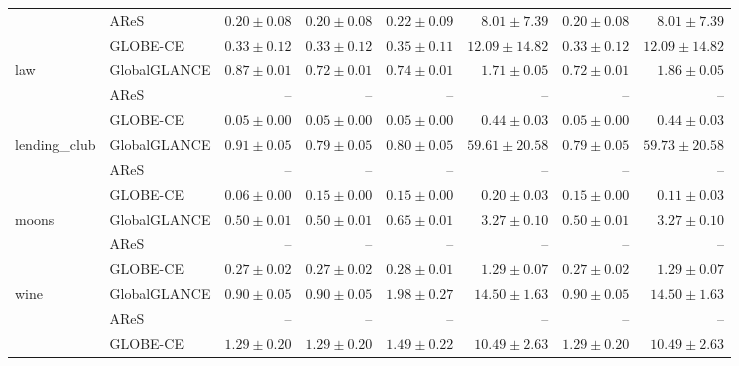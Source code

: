 \begin{table}[ht]
\begin{center}
\begin{sc}
\begin{scriptsize}
\begin{tabular}{l|l|rrrrrr}
 & AReS & $\boldsymbol{0.20\pm{0.08}}$ & $\boldsymbol{0.20\pm{0.08}}$ & $\boldsymbol{0.22\pm{0.09}}$ & $\boldsymbol{8.01\pm{7.39}}$ & $\boldsymbol{0.20\pm{0.08}}$ & $\boldsymbol{8.01\pm{7.39}}$ \\
 & GLOBE-CE & $0.33\pm{0.12}$ & $0.33\pm{0.12}$ & $0.35\pm{0.11}$ & $12.09\pm{14.82}$ & $0.33\pm{0.12}$ & $12.09\pm{14.82}$ \\
\midrule
\multirow{3}{*}{law} & GlobalGLANCE & $0.87\pm{0.01}$ & $0.72\pm{0.01}$ & $0.74\pm{0.01}$ & $1.71\pm{0.05}$ & $0.72\pm{0.01}$ & $1.86\pm{0.05}$ \\
 & AReS & -- & -- & -- & -- & -- & -- \\
 & GLOBE-CE & $\boldsymbol{0.05\pm{0.00}}$ & $\boldsymbol{0.05\pm{0.00}}$ & $\boldsymbol{0.05\pm{0.00}}$ & $\boldsymbol{0.44\pm{0.03}}$ & $\boldsymbol{0.05\pm{0.00}}$ & $\boldsymbol{0.44\pm{0.03}}$ \\
\midrule
\multirow{3}{*}{lending\_club} & GlobalGLANCE & $0.91\pm{0.05}$ & $0.79\pm{0.05}$ & $0.80\pm{0.05}$ & $59.61\pm{20.58}$ & $0.79\pm{0.05}$ & $59.73\pm{20.58}$ \\
 & AReS & -- & -- & -- & -- & -- & -- \\
 & GLOBE-CE & $\boldsymbol{0.06\pm{0.00}}$ & $\boldsymbol{0.15\pm{0.00}}$ & $\boldsymbol{0.15\pm{0.00}}$ & $\boldsymbol{0.20\pm{0.03}}$ & $\boldsymbol{0.15\pm{0.00}}$ & $\boldsymbol{0.11\pm{0.03}}$ \\
\midrule
\multirow{3}{*}{moons} & GlobalGLANCE & $0.50\pm{0.01}$ & $0.50\pm{0.01}$ & $0.65\pm{0.01}$ & $3.27\pm{0.10}$ & $0.50\pm{0.01}$ & $3.27\pm{0.10}$ \\
 & AReS & -- & -- & -- & -- & -- & -- \\
 & GLOBE-CE & $\boldsymbol{0.27\pm{0.02}}$ & $\boldsymbol{0.27\pm{0.02}}$ & $\boldsymbol{0.28\pm{0.01}}$ & $\boldsymbol{1.29\pm{0.07}}$ & $\boldsymbol{0.27\pm{0.02}}$ & $\boldsymbol{1.29\pm{0.07}}$ \\
\midrule
\multirow{3}{*}{wine} & GlobalGLANCE & $\boldsymbol{0.90\pm{0.05}}$ & $\boldsymbol{0.90\pm{0.05}}$ & $1.98\pm{0.27}$ & $14.50\pm{1.63}$ & $\boldsymbol{0.90\pm{0.05}}$ & $14.50\pm{1.63}$ \\
 & AReS & -- & -- & -- & -- & -- & -- \\
 & GLOBE-CE & $1.29\pm{0.20}$ & $1.29\pm{0.20}$ & $\boldsymbol{1.49\pm{0.22}}$ & $\boldsymbol{10.49\pm{2.63}}$ & $1.29\pm{0.20}$ & $\boldsymbol{10.49\pm{2.63}}$ \\
\bottomrule
\end{tabular}
\end{scriptsize}
\end{sc}
\end{center}
\end{table}

